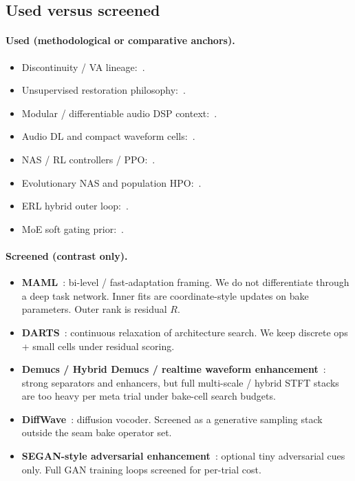 \subsection{Used versus screened}
\label{sec:used-screened}

\paragraph{Used (methodological or comparative anchors).}
\begin{itemize}
  \item Discontinuity / VA lineage:~\cite{stilson1996,esqueda2016blamp,nam2009polyblep}.
  \item Unsupervised restoration philosophy:~\cite{lehtinen2018,kashyap2021n2n,wisdom2020}.
  \item Modular / differentiable audio DSP context:~\cite{engel2020}.
  \item Audio DL and compact waveform cells:~\cite{purwins2019,stoller2018,macartney2018,jansson2017,luo2019,luo2020dprnn,subakan2021,gong2021ast,ronneberger2015,he2016resnet,vaswani2017}.
  \item NAS / RL controllers / PPO:~\cite{elsken2019,zoph2017nas,pham2018,schulman2017,tan2019mnasnet,liu2018pnas}.
  \item Evolutionary NAS and population HPO:~\cite{real2017large,real2019,jaderberg2017,snoek2012,hansen2016cmaes}.
  \item ERL hybrid outer loop:~\cite{khadka2018}.
  \item MoE soft gating prior:~\cite{shazeer2017}.
\end{itemize}

\paragraph{Screened (contrast only).}
\begin{itemize}
  \item \textbf{MAML}~\cite{finn2017}: bi-level / fast-adaptation framing. We do not differentiate through a deep task network. Inner fits are coordinate-style updates on bake parameters. Outer rank is residual $R$.
  \item \textbf{DARTS}~\cite{liu2019}: continuous relaxation of architecture search. We keep discrete ops + small cells under residual scoring.
  \item \textbf{Demucs / Hybrid Demucs / realtime waveform enhancement}~\cite{dfossez2019,dfossez2021,dfossez2020}: strong separators and enhancers, but full multi-scale / hybrid STFT stacks are too heavy per meta trial under bake-cell search budgets.
  \item \textbf{DiffWave}~\cite{kong2021}: diffusion vocoder. Screened as a generative sampling stack outside the seam bake operator set.
  \item \textbf{SEGAN-style adversarial enhancement}~\cite{pascual2017}: optional tiny adversarial cues only. Full GAN training loops screened for per-trial cost.
\end{itemize}

